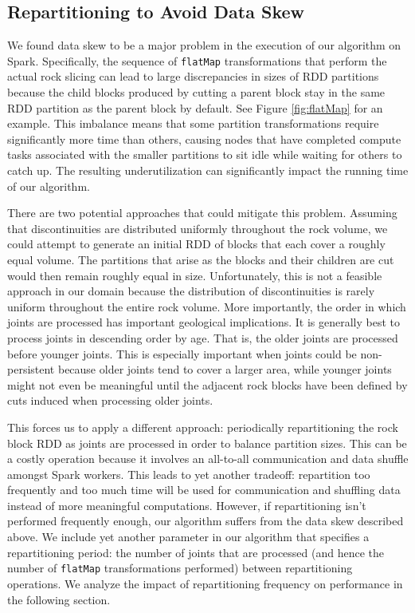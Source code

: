 \subsection{Repartitioning to Avoid Data Skew}
We found data skew to be a major problem in the execution of our algorithm on Spark. Specifically, the sequence of \texttt{flatMap} transformations that perform the actual rock slicing can lead to large discrepancies in sizes of RDD partitions because the child blocks produced by cutting a parent block stay in the same RDD partition as the parent block by default. See Figure \ref{fig:flatMap} for an example. This imbalance means that some partition transformations require significantly more time than others, causing nodes that have completed compute tasks associated with the smaller partitions to sit idle while waiting for others to catch up. The resulting underutilization can significantly impact the running time of our algorithm.

There are two potential approaches that could mitigate this problem. Assuming that discontinuities are distributed uniformly throughout the rock volume, we could attempt to generate an initial RDD of blocks that each cover a roughly equal volume. The partitions that arise as the blocks and their children are cut would then remain roughly equal in size. Unfortunately, this is not a feasible approach in our domain because the distribution of discontinuities is rarely uniform throughout the entire rock volume. More importantly, the order in which joints are processed has important geological implications. It is generally best to process joints in descending order by age. That is, the older joints are processed before younger joints. This is especially important when joints could be non-persistent because older joints tend to cover a larger area, while younger joints might not even be meaningful until the adjacent rock blocks have been defined by cuts induced when processing older joints.

This forces us to apply a different approach: periodically repartitioning the rock block RDD as joints are processed in order to balance partition sizes. This can be a costly operation because it involves an all-to-all communication and data shuffle amongst Spark workers. This leads to yet another tradeoff: repartition too frequently and too much time will be used for communication and shuffling data instead of more meaningful computations. However, if repartitioning isn't performed frequently enough, our algorithm suffers from the data skew described above. We include yet another parameter in our algorithm that specifies a repartitioning period: the number of joints that are processed (and hence the number of \texttt{flatMap} transformations performed) between repartitioning operations. We analyze the impact of repartitioning frequency on performance in the following section.